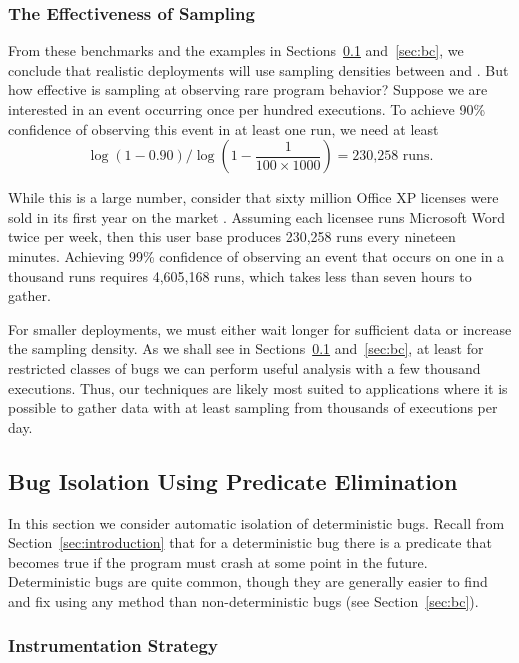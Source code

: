 \subsubsection{The Effectiveness of Sampling}

From these benchmarks and the examples in Sections~\ref{sec:ccrypt}
and~\ref{sec:bc}, we conclude that realistic deployments will use
sampling densities between  and .
But how effective is  sampling at observing rare
program behavior?  Suppose we are interested in an event occurring once
per hundred executions.  To achieve 90\% confidence of observing this
event in at least one run, we need at least
\[\log{(1-0.90)} / \log{\left( 1 - \frac{1}{100 \times 1000}\right)} = \text{230,258 runs.}\]

While this is a large number, consider that sixty million Office XP
licenses were sold in its first year on the market
\cite{Microsoft:2002:AR-F10K}.  Assuming each licensee runs Microsoft
Word twice per week, then this user base produces 230,258 runs every
nineteen minutes.  Achieving 99\% confidence of observing an 
event that occurs on one in a thousand runs requires 4,605,168 runs, 
which takes less than seven hours to gather.  

For smaller deployments, we must either wait longer for sufficient
data or increase the sampling density.  As we shall see in
Sections~\ref{sec:ccrypt} and~\ref{sec:bc}, at least for restricted
classes of bugs we can perform useful analysis with a few thousand
executions.  Thus, our techniques are likely most suited to
applications where it is possible to gather data with at least   sampling from thousands of executions per day.


\subsection{Bug Isolation Using Predicate Elimination}
\label{sec:ccrypt}

In this section we consider automatic isolation of deterministic
bugs.  Recall from Section~\ref{sec:introduction} that for a deterministic
bug there is a predicate that becomes true
if the program must crash at some point in the future.
Deterministic bugs are quite common, though they are generally easier
to find and fix using any method than non-deterministic bugs (see
Section~\ref{sec:bc}).

\subsubsection{Instrumentation Strategy}

